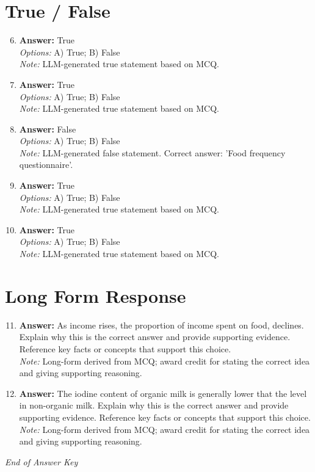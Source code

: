 \documentclass[12pt]{article}
\begin{document}
\section*{True / False}
\begin{enumerate}[label=\arabic*.]
\setcounter{enumi}{5}
\item \textbf{Answer:} True
\\ \textit{Options:} A) True; B) False
\\ \textit{Note:} LLM-generated true statement based on MCQ.
\item \textbf{Answer:} True
\\ \textit{Options:} A) True; B) False
\\ \textit{Note:} LLM-generated true statement based on MCQ.
\item \textbf{Answer:} False
\\ \textit{Options:} A) True; B) False
\\ \textit{Note:} LLM-generated false statement. Correct answer: 'Food frequency questionnaire'.
\item \textbf{Answer:} True
\\ \textit{Options:} A) True; B) False
\\ \textit{Note:} LLM-generated true statement based on MCQ.
\item \textbf{Answer:} True
\\ \textit{Options:} A) True; B) False
\\ \textit{Note:} LLM-generated true statement based on MCQ.
\end{enumerate}

\section*{Long Form Response}
\begin{enumerate}[label=\arabic*.]
\setcounter{enumi}{10}
\item \textbf{Answer:} As income rises, the proportion of income spent on food, declines. Explain why this is the correct answer and provide supporting evidence. Reference key facts or concepts that support this choice.
\\ \textit{Note:} Long-form derived from MCQ; award credit for stating the correct idea and giving supporting reasoning.
\item \textbf{Answer:} The iodine content of organic milk is generally lower that the level in non-organic milk. Explain why this is the correct answer and provide supporting evidence. Reference key facts or concepts that support this choice.
\\ \textit{Note:} Long-form derived from MCQ; award credit for stating the correct idea and giving supporting reasoning.
\end{enumerate}

\vfill
\noindent\textit{End of Answer Key}
\end{document}
